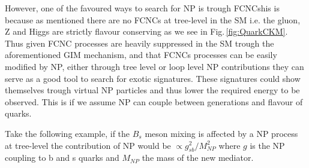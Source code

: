 However, one of the favoured ways to search for NP is trough FCNCshis is because \Joaoadd{,} as mentioned  there are no FCNCs at tree-level in the SM i.e. the gluon, Z and Higgs are strictly flavour conserving as we see in Fig.\,\ref{fig:QuarkCKM}.  
%
Thus given FCNC processes are heavily suppressed in the SM trough the aforementioned GIM mechanism, and that FCNCs processes can be easily modified by NP, either through tree level or loop level NP contributions they can serve as a good tool to search for exotic signatures. 
%
These signatures could show themselves trough virtual NP particles and thus lower the required energy to be observed. 
%
This is if we assume NP can couple between generations and flavour of quarks. 

Take the following example, if the $B_s$ meson mixing is affected by a NP process at tree-level the contribution of NP would be $\propto g^2_{sb} / M^2_{NP} $ where $g$ is the NP coupling to b and s quarks and $M_{NP}$ the mass of the new mediator.


